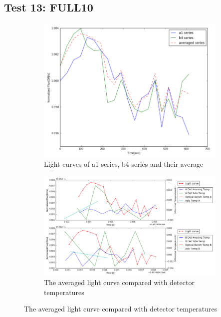 \documentclass[conference]{IEEEtran}
\begin{document}
\subsection{Test 13: FULL10} 
\begin{figure}[H]
    \centering
    \begin{subfigure}{1}
        \includegraphics[scale=0.4]{ts_test13}
        \caption{Light curves of a1 series, b4 series and their average}
    \end{subfigure}

    \begin{subfigure}{2}
        \includegraphics[scale=0.4]{temp_test13}
        \caption{The averaged light curve compared with detector temperatures}
    \end{subfigure}
   

\end{figure}
\end{document}
